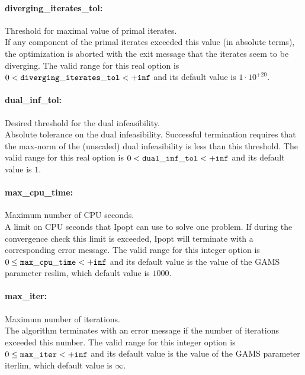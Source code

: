 \paragraph{diverging\_iterates\_tol:}\label{sec:diverging_iterates_tol} Threshold for maximal value of primal iterates. $\;$ \\
 If any component of the primal iterates exceeded
this value (in absolute terms), the optimization
is aborted with the exit message that the
iterates seem to be diverging. The valid range for this real option is 
$0 <  {\tt diverging\_iterates\_tol } <  {\tt +inf}$
and its default value is $1 \cdot 10^{+20}$.


\paragraph{dual\_inf\_tol:}\label{sec:dual_inf_tol} Desired threshold for the dual infeasibility. $\;$ \\
 Absolute tolerance on the dual infeasibility.
Successful termination requires that the max-norm
of the (unscaled) dual infeasibility is less than
this threshold. The valid range for this real option is 
$0 <  {\tt dual\_inf\_tol } <  {\tt +inf}$
and its default value is $1$.

\paragraph{max\_cpu\_time:}\label{sec:max_cpu_time} Maximum number of CPU seconds. $\;$ \\
     A limit on CPU seconds that Ipopt can use to solve one problem.  If
     during the convergence check this limit is exceeded, Ipopt will terminate
     with a corresponding error message.
The valid range for this integer option is
$0 \le {\tt max\_cpu\_time } <  {\tt +inf}$
and its default value is the value of the GAMS parameter reslim, which default value is $1000$.

\paragraph{max\_iter:}\label{sec:max_iter} Maximum number of iterations. $\;$ \\
 The algorithm terminates with an error message if
the number of iterations exceeded this number. The valid range for this integer option is
$0 \le {\tt max\_iter } <  {\tt +inf}$
and its default value is the value of the GAMS parameter iterlim, which default value is $\infty$.



